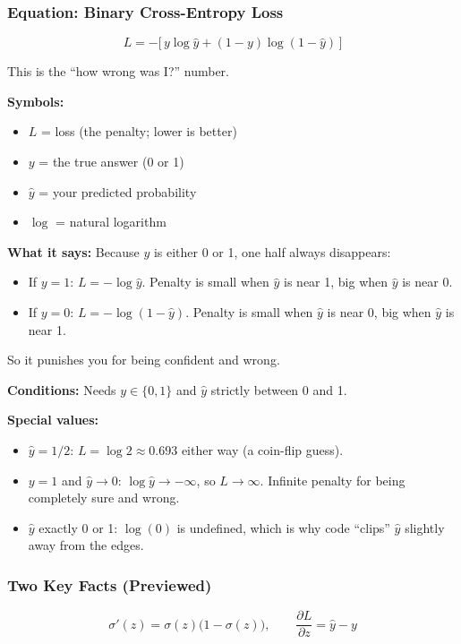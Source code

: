 \subsubsection*{Equation: Binary Cross-Entropy Loss}

\[
L = -\Big[\, y \log \hat{y} + (1 - y)\log(1 - \hat{y}) \,\Big]
\]

This is the ``how wrong was I?'' number.

\textbf{Symbols:}
\begin{itemize}
  \item $L$ = loss (the penalty; lower is better)
  \item $y$ = the true answer (0 or 1)
  \item $\hat{y}$ = your predicted probability
  \item $\log$ = natural logarithm
\end{itemize}

\textbf{What it says:} Because $y$ is either 0 or 1, one half always disappears:
\begin{itemize}
  \item If $y = 1$: $L = -\log \hat{y}$. Penalty is small when $\hat{y}$ is near 1, big when $\hat{y}$ is near 0.
  \item If $y = 0$: $L = -\log(1 - \hat{y})$. Penalty is small when $\hat{y}$ is near 0, big when $\hat{y}$ is near 1.
\end{itemize}
So it punishes you for being confident and wrong.

\textbf{Conditions:} Needs $y \in \{0, 1\}$ and $\hat{y}$ strictly between 0 and 1.

\textbf{Special values:}
\begin{itemize}
  \item $\hat{y} = 1/2$: $L = \log 2 \approx 0.693$ either way (a coin-flip guess).
  \item $y = 1$ and $\hat{y} \to 0$: $\log \hat{y} \to -\infty$, so $L \to \infty$. Infinite penalty for being completely sure and wrong.
  \item $\hat{y}$ exactly 0 or 1: $\log(0)$ is undefined, which is why code ``clips'' $\hat{y}$ slightly away from the edges.
\end{itemize}

\subsubsection*{Two Key Facts (Previewed)}

\[
\sigma'(z) = \sigma(z)\big(1 - \sigma(z)\big), \qquad \frac{\partial L}{\partial z} = \hat{y} - y
\]

